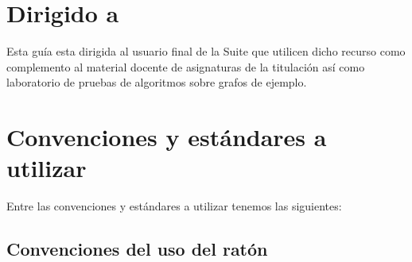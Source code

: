 \section{Dirigido a}

Esta guía esta dirigida al usuario final de la Suite que utilicen dicho recurso como complemento al material docente de asignaturas de la titulación así como laboratorio de pruebas de algoritmos sobre grafos de ejemplo.

\section{Convenciones y estándares a utilizar}

Entre las convenciones y estándares a utilizar tenemos las siguientes:

\subsection{Convenciones del uso del ratón}


